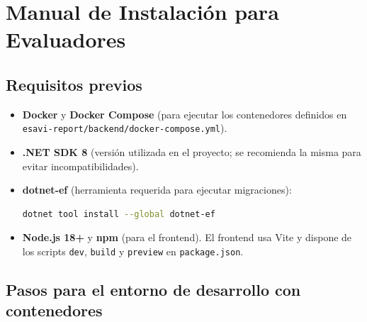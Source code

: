\documentclass[12pt,letterpaper]{article}
\begin{document}
\appendix

\section{Manual de Instalación para Evaluadores}

\subsection{Requisitos previos}

\begin{itemize}
    \item \textbf{Docker} y \textbf{Docker Compose} (para ejecutar los contenedores definidos en \texttt{esavi-report/backend/docker-compose.yml}).
    \item \textbf{.NET SDK 8} (versión utilizada en el proyecto; se recomienda la misma para evitar incompatibilidades).
    \item \textbf{dotnet-ef} (herramienta requerida para ejecutar migraciones):
    \begin{lstlisting}[language=bash]
dotnet tool install --global dotnet-ef
    \end{lstlisting}
   \item \textbf{Node.js 18+} y \textbf{npm} (para el frontend). El frontend usa Vite y dispone de los scripts \texttt{dev}, \texttt{build} y \texttt{preview} en \texttt{package.json}.

\end{itemize}

\subsection{Pasos para el entorno de desarrollo con contenedores}
\end{document}
